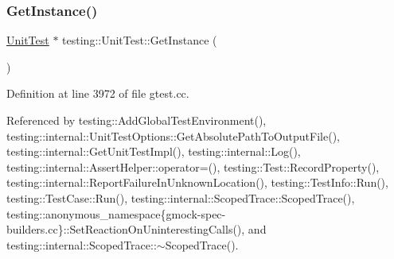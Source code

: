 \subsubsection{\texorpdfstring{Get\+Instance()}{GetInstance()}}
{\footnotesize\ttfamily \hyperlink{classtesting_1_1UnitTest}{Unit\+Test} $\ast$ testing\+::\+Unit\+Test\+::\+Get\+Instance (\begin{DoxyParamCaption}{ }\end{DoxyParamCaption})\hspace{0.3cm}{\ttfamily [static]}}



Definition at line 3972 of file gtest.\+cc.



Referenced by testing\+::\+Add\+Global\+Test\+Environment(), testing\+::internal\+::\+Unit\+Test\+Options\+::\+Get\+Absolute\+Path\+To\+Output\+File(), testing\+::internal\+::\+Get\+Unit\+Test\+Impl(), testing\+::internal\+::\+Log(), testing\+::internal\+::\+Assert\+Helper\+::operator=(), testing\+::\+Test\+::\+Record\+Property(), testing\+::internal\+::\+Report\+Failure\+In\+Unknown\+Location(), testing\+::\+Test\+Info\+::\+Run(), testing\+::\+Test\+Case\+::\+Run(), testing\+::internal\+::\+Scoped\+Trace\+::\+Scoped\+Trace(), testing\+::anonymous\+\_\+namespace\{gmock-\/spec-\/builders.\+cc\}\+::\+Set\+Reaction\+On\+Uninteresting\+Calls(), and testing\+::internal\+::\+Scoped\+Trace\+::$\sim$\+Scoped\+Trace().


